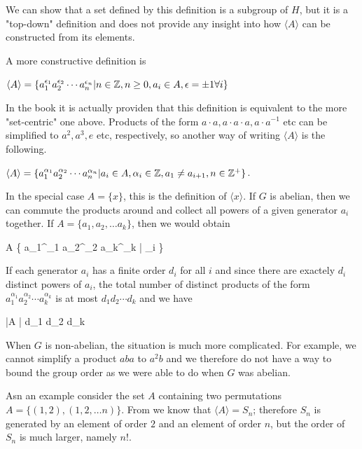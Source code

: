 We can show that a set defined by this definition is a subgroup of $H$, but it is a "top-down" definition and does not provide any insight into how $\langle A \rangle$ can be constructed from its elements.

A more constructive definition is

\begin{definition}
	$\langle A \rangle = \{a_1^{\epsilon_1} a_2^{\epsilon_2} \cdots a_n^{\epsilon_n} | n \in \mathbb{Z}, n \geq 0, a_i \in A, \epsilon = \pm 1 \forall i  \}$
\end{definition}

In the book it is actually providen that this definition is equivalent to the more "set-centric" one above. Products of the form $a \cdot a, a \cdot a \cdot a, a \cdot a^{-1}$ etc can be simplified to $a^2, a^3, e$ etc, respectively, so another way of writing $\langle A \rangle$ is the following.

\begin{definition}
	$\langle A \rangle = \{a_1^{\alpha_1} a_2^{\alpha_2} \cdots a_n^{\alpha_n} | a_i \in A, \alpha_i \in \mathbb{Z}, a_1 \neq a_{i+1}, n \in \mathbb{Z}^+ \} $.
\end{definition}

In the special case $A = \{x\}$, this is the definition of $\langle x \rangle$. If $G$ is abelian, then we can commute the products around and collect all powers of a given generator $a_i$ together. If $A = \{ a_1, a_2, \ldots a_k\}$, then we would obtain

\bee
	\langle A \rangle \{ a_1^{\alpha_1} a_2^{\alpha_2} \cdots a_k^{\alpha_k} | \alpha_i \in \mZ \}
\eee

If each generator $a_i$ has a finite order $d_i$ for all $i$ and since there are exactely $d_i$ distinct powers of $a_i$, the total number of distinct products of the form $a_1^{\alpha_1} a_2^{\alpha_2} \cdots a_k^{\alpha_k}$ is at most $d_1 d_2 \cdots d_k$ and we have

\bee
	|\langle A \rangle| \leq d_1 d_2 \cdots d_k
\eee

When $G$ is non-abelian, the situation is much more complicated. For example, we cannot simplify a product $aba$ to $a^2 b$ and we therefore do not have a way to bound the group order as we were able to do when $G$ was abelian.

Asn an example consider the set $A$ containing two permutations $A = \{(1,2), (1,2,\ldots n)\}$. From  we know that $\langle A \rangle = S_n$; therefore $S_n$ is generated by an element of order $2$ and an element of order $n$, but the order of $S_n$ is much larger, namely $n!$. 



